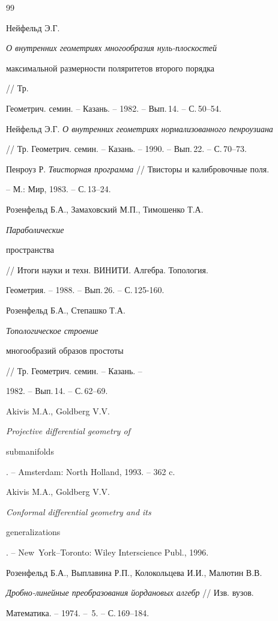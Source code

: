 \begin{thebibliography}{99}







Нейфельд Э.Г. {\em О внутренних геометриях многообразия нуль-плоскостей


максимальной размерности поляритетов второго порядка} // Тр.


Геометрич. семин. -- Казань. -- 1982. -- Вып.\,14. -- С.\,50--54.




Нейфельд Э.Г. {\em О внутренних геометриях нормализованного пенроузиана}


// Тр. Геометрич. семин. -- Казань. -- 1990. -- Вып.\,22. -- С.\,70--73.




Пенроуз Р. {\em Твисторная программа} // Твисторы и калибровочные поля.


-- М.: Мир, 1983. -- С.\,13--24.




Розенфельд Б.А., Замаховский М.П., Тимошенко Т.А. {\em Параболические


пространства} // Итоги науки и техн. ВИНИТИ. Алгебра. Топология.


Геометрия. -- 1988. -- Вып.\,26. -- С.\,125-160.




Розенфельд Б.А., Степашко Т.А. {\em Топологическое строение


многообразий образов простоты} // Тр. Геометрич. семин. -- Казань. --


1982. -- Вып.\,14. -- С.\,62--69.




Akivis M.A., Goldberg V.V. {\em Projective differential geometry of


submanifolds}. -- Amsterdam: North Holland, 1993. -- 362 c.




Akivis M.A., Goldberg V.V. {\em Conformal differential geometry and its


generalizations}. -- New~York--Toronto: Wiley Interscience Publ., 1996.




Розенфельд Б.А., Выплавина Р.П., Колокольцева И.И., Малютин В.В.


{\em Дробно-линейные преобразования йордановых алгебр} // Изв. вузов.


Математика. -- 1974. -- \No\,5. -- С.\,169--184.





\end{thebibliography}





\vskip 2cm












\label{end}





